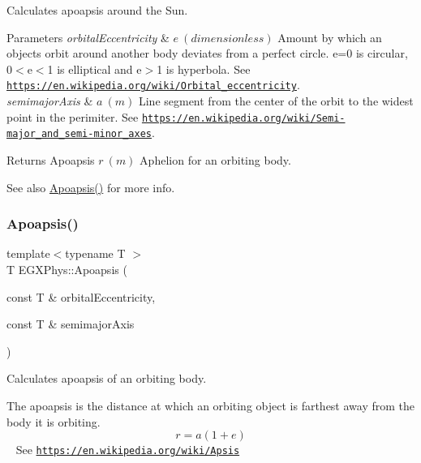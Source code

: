 Calculates apoapsis around the Sun. 


\begin{DoxyParams}{Parameters}
{\em orbital\+Eccentricity} & $ e\ (dimensionless)$ Amount by which an objects orbit around another body deviates from a perfect circle. e=0 is circular, 0$<$e$<$1 is elliptical and e$>$1 is hyperbola. See \href{https://en.wikipedia.org/wiki/Orbital_eccentricity}{\tt https\+://en.\+wikipedia.\+org/wiki/\+Orbital\+\_\+eccentricity}. \\
\hline
{\em semimajor\+Axis} & $ a\ (m)$ Line segment from the center of the orbit to the widest point in the perimiter. See \href{https://en.wikipedia.org/wiki/Semi-major_and_semi-minor_axes}{\tt https\+://en.\+wikipedia.\+org/wiki/\+Semi-\/major\+\_\+and\+\_\+semi-\/minor\+\_\+axes}. \\
\hline
\end{DoxyParams}
\begin{DoxyReturn}{Returns}
Apoapsis $ r\ (m)$ Aphelion for an orbiting body. 
\end{DoxyReturn}
\begin{DoxySeeAlso}{See also}
\mbox{\hyperlink{group___e_g_x_phys-_apoapsis_gaf962e650bf84a568458e8eb39b1c61ba}{Apoapsis()}} for more info. 
\end{DoxySeeAlso}
\mbox{\label{group___e_g_x_phys-_apoapsis_gaf962e650bf84a568458e8eb39b1c61ba}} 
\subsubsection{\texorpdfstring{Apoapsis()}{Apoapsis()}}
{\footnotesize\ttfamily template$<$typename T $>$ \\
T E\+G\+X\+Phys\+::\+Apoapsis (\begin{DoxyParamCaption}\item[{const T \&}]{orbital\+Eccentricity,  }\item[{const T \&}]{semimajor\+Axis }\end{DoxyParamCaption})}



Calculates apoapsis of an orbiting body. 

The apoapsis is the distance at which an orbiting object is farthest away from the body it is orbiting. \[r=a(1+e)\] ~\newline
See \href{https://en.wikipedia.org/wiki/Apsis}{\tt https\+://en.\+wikipedia.\+org/wiki/\+Apsis}

